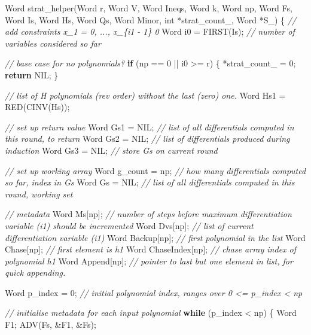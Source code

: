 \documentclass[
]{book}
\newenvironment{Shaded}{\begin{snugshade}}{\end{snugshade}}
\newcommand{\CommentTok}[1]{\textcolor[rgb]{0.56,0.35,0.01}{\textit{#1}}}
\newcommand{\ControlFlowTok}[1]{\textcolor[rgb]{0.13,0.29,0.53}{\textbf{#1}}}
\newcommand{\DataTypeTok}[1]{\textcolor[rgb]{0.13,0.29,0.53}{#1}}
\newcommand{\DecValTok}[1]{\textcolor[rgb]{0.00,0.00,0.81}{#1}}
\newcommand{\NormalTok}[1]{#1}
\theoremstyle{definition}
\theoremstyle{definition}
\theoremstyle{definition}
\theoremstyle{definition}
\theoremstyle{remark}
\begin{document}
\begin{Shaded}
\begin{Highlighting}[numbers=left,,]
\NormalTok{Word strat\_helper(Word r, Word V, Word Ineqs, Word k, Word np, Word Fs, Word Is, Word Hs, Word Qs, Word Minor, }\DataTypeTok{int}\NormalTok{ *strat\_count\_, Word *S\_)}
\NormalTok{\{}
    \CommentTok{// add constraints x\_1 = 0, ..., x\_\{i1 {-} 1\}  0}
\NormalTok{    Word i0 = FIRST(Is); }\CommentTok{// number of variables considered so far}

    \CommentTok{// base case for no polynomials?}
    \ControlFlowTok{if}\NormalTok{ (np == }\DecValTok{0}\NormalTok{ || i0 \textgreater{}= r) \{}
\NormalTok{        *strat\_count\_ = }\DecValTok{0}\NormalTok{;}
        \ControlFlowTok{return}\NormalTok{ NIL;}
\NormalTok{    \}}

    \CommentTok{// list of H polynomials (rev order) without the last (zero) one.}
\NormalTok{    Word Hs1 = RED(CINV(Hs));}

    \CommentTok{// set up return value}
\NormalTok{    Word Gs1 = NIL; }\CommentTok{// list of all differentials computed in this round, to return}
\NormalTok{    Word Gs2 = NIL; }\CommentTok{// list of differentials produced during induction}
\NormalTok{    Word Gs3 = NIL; }\CommentTok{// store Gs on current round}

    \CommentTok{// set up working array}
\NormalTok{    Word g\_count = np; }\CommentTok{// how many differentials computed so far, index in Gs}
\NormalTok{    Word Gs = NIL; }\CommentTok{// list of all differentials computed in this round, working set}

    \CommentTok{// metadata}
\NormalTok{    Word Ms[np]; }\CommentTok{// number of steps before maximum differentiation variable (i1) should be incremented}
\NormalTok{    Word Dvs[np]; }\CommentTok{// list of current differentiation variable (i1)}
\NormalTok{    Word Backup[np]; }\CommentTok{// first polynomial in the list}
\NormalTok{    Word Chase[np]; }\CommentTok{// first element is h1}
\NormalTok{    Word ChaseIndex[np]; }\CommentTok{// chase array index of polynomial h1}
\NormalTok{    Word Append[np]; }\CommentTok{// pointer to last but one element in list, for quick appending.}

\NormalTok{    Word p\_index = }\DecValTok{0}\NormalTok{; }\CommentTok{// initial polynomial index, ranges over 0 \textless{}= p\_index \textless{} np}

    \CommentTok{// initialise metadata for each input polynomial}
    \ControlFlowTok{while}\NormalTok{ (p\_index \textless{} np) \{}
\NormalTok{        Word F1;}
\NormalTok{        ADV(Fs, \&F1, \&Fs);}


\end{Highlighting}
\end{Shaded}
\end{document}
